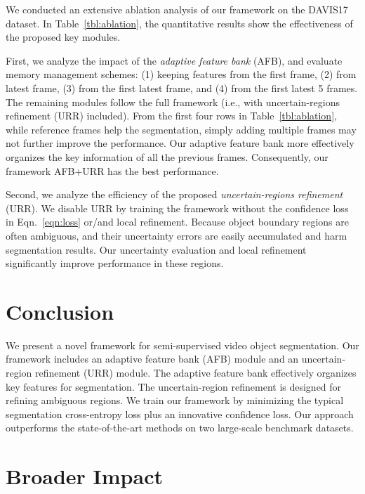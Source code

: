 \documentclass{article}
\begin{document}
We conducted an extensive ablation analysis of our framework on the DAVIS17 dataset.
In Table~\ref{tbl:ablation}, the quantitative results show the effectiveness of the proposed key modules.

First, we analyze the impact of the \emph{adaptive feature bank} (AFB), and evaluate  memory management schemes: (1) keeping features from the first frame,
(2) from latest frame, 
(3) from the first  latest frame, and
(4) from the first  latest 5 frames.
The remaining modules follow the full framework (i.e., with uncertain-regions refinement (URR) included). 
From the first four rows in Table~\ref{tbl:ablation}, while reference frames help the segmentation, simply adding multiple frames may not further improve the performance. 
Our adaptive feature bank more effectively organizes the key information of all the previous frames. 
Consequently, our framework AFB+URR has the best performance.

Second, we analyze the efficiency of the proposed \emph{uncertain-regions refinement} (URR).
We disable URR by training the framework without the confidence loss  in Eqn.~\ref{eqn:loss} or/and local refinement. 
Because object boundary regions are often ambiguous, and their uncertainty errors are easily accumulated and harm segmentation results. 
Our uncertainty evaluation and local refinement significantly improve performance in these regions. 


\section{Conclusion}

We present a novel framework for semi-supervised video object segmentation. 
Our framework includes an adaptive feature bank (AFB) module and an uncertain-region refinement (URR) module.
The adaptive feature bank effectively organizes key features for segmentation.
The uncertain-region refinement is designed for refining ambiguous regions. 
We train our framework by minimizing the typical segmentation cross-entropy loss plus an innovative confidence loss. 
Our approach outperforms the state-of-the-art methods on two large-scale benchmark datasets.

\newpage

\section*{Broader Impact}
\end{document}
